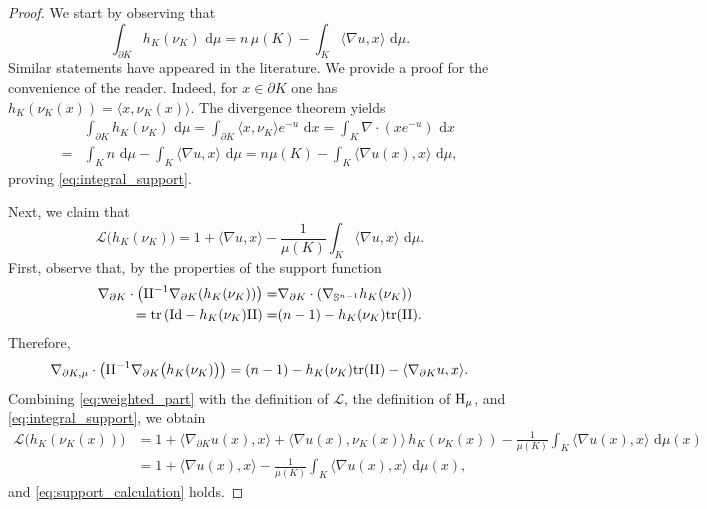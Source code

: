\documentclass[a4paper, 11pt]{article}
\newcommand{\sph}{\mathbb{S}}
\newcommand{\tra}{\mathrm{tr}}
\newcommand{\Id}{\mathrm{Id}}
\theoremstyle{definition}
\newcommand{\di}{\, \mathrm{d}}
\begin{document}
\begin{proof}
We start by observing that 
\begin{equation}\label{eq:integral_support}
    \int_{\partial K} h_{K}(\nu_{K})\,\di \mu
= n\,\mu(K) -\int_{K}\langle \nabla u,x\rangle \,\di \mu.
\end{equation}
Similar statements have appeared in the literature. We provide a proof for the convenience of the reader. Indeed, for $x\in \partial K$ one has $h_{K}(\nu_{K}(x))=\langle x,\nu_{K}(x)\rangle$. The divergence theorem yields
\begin{align*}
&\int_{\partial K}h_{K}(\nu_{K})\,\di\mu
=\int_{\partial K} \langle x, \nu_{K}\rangle e^{-u}\,\di x=
\int_{K} \nabla \cdot \left(x e^{-u}\right)\,\di x \\
=&\int_{K} n\,\di\mu -\int_{K}\langle \nabla u,x\rangle\,\di \mu 
=n\mu(K)-\int_{K}\langle \nabla u(x),x\rangle\,\di \mu,
\end{align*}
proving \eqref{eq:integral_support}.

Next, we claim that
\begin{equation}\label{eq:support_calculation}
\mathcal{L}\big(h_{K}(\nu_{K})\big) = 1+\langle \nabla u,x\rangle -\frac{1}{\mu(K)}\int_{K} \langle \nabla u, x\rangle \,\di \mu.
\end{equation}
First, observe that, by the properties of the support function
\begin{align*}
    \nabla_{\partial K} \cdot \left( {\rm II}^{-1} \nabla_{\partial K}(h_K(\nu_K))\right)= & \nabla_{\partial K}\cdot \left( \nabla_{\sph^{n-1}}h_K(\nu_K)\right)\\
    = \tra\left( \Id -h_K(\nu_K){\rm II}\right)= &(n-1)-h_K(\nu_K)\tra({\rm II}).
\end{align*}
Therefore,
\begin{equation}\label{eq:weighted_part}
\nabla_{\partial K, \mu} \cdot \left({\rm II}^{-1}\nabla_{\partial K}\big(h_{K}(\nu_{K})\big)\right) =(n-1)-h_K(\nu_K)\tra({\rm II})
-\langle \nabla_{\partial K}u, x\rangle .
\end{equation}
Combining \eqref{eq:weighted_part} with the definition of $\mathcal{L}$, the definition of ${\rm H}_\mu$, and \eqref{eq:integral_support}, we obtain
\begin{align*}
\mathcal{L}\big(h_{K}(\nu_{K}(x))\big)
&=
1+\langle \nabla_{\partial K}u(x), x\rangle
+\langle \nabla u(x), \nu_{K}(x)\rangle\,h_{K}(\nu_{K}(x))
-\frac{1}{\mu(K)} \int_{K} \langle \nabla u(x), x\rangle \,\di \mu(x) \\
&=
1+\langle \nabla u(x), x\rangle
-\frac{1}{\mu(K)}\int_{K} \langle \nabla u(x), x\rangle \,\di \mu(x),
\end{align*}
and \eqref{eq:support_calculation} holds. 


\end{proof}
\end{document}

